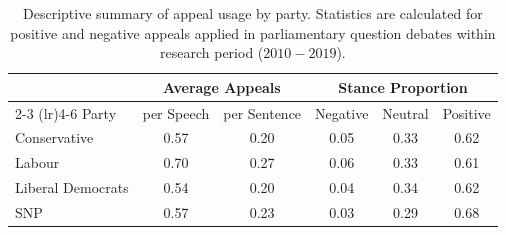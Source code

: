 \begin{table}[htbp]
\centering
\begin{tabular}{lccccc}
\toprule
 & \multicolumn{2}{c}{Average Appeals} & \multicolumn{3}{c}{Stance Proportion} \\
\cmidrule(lr){2-3} \cmidrule(lr){4-6}
Party & per Speech & per Sentence & Negative & Neutral & Positive \\
\midrule
Conservative & 0.57 & 0.20 & 0.05 & 0.33 & 0.62 \\
Labour & 0.70 & 0.27 & 0.06 & 0.33 & 0.61 \\
Liberal Democrats & 0.54 & 0.20 & 0.04 & 0.34 & 0.62 \\
SNP & 0.57 & 0.23 & 0.03 & 0.29 & 0.68 \\
\bottomrule
\end{tabular}
\caption[Descriptive summary of appeal usage by party]{Descriptive summary of appeal usage by party. Statistics are calculated for positive and negative appeals applied in parliamentary question debates within research period ($2010-2019$).}
\label{tab:party_appeal_shares}
\end{table}